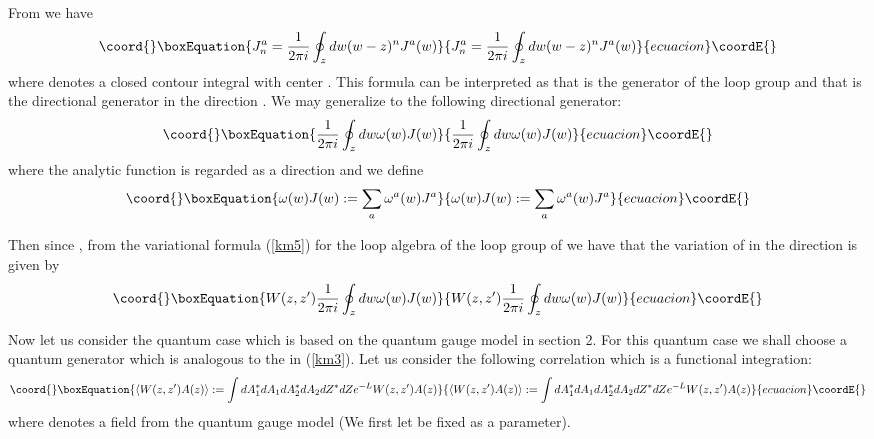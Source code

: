 \documentclass[a4paper,a4paper]{article}
\begin{document}
From \coordHE{} we have 
\begin{equation}\coord{}\boxEquation{
J_n^a=  \frac{1}{2\pi i}\oint_z dw (w-z)^{n}J^a(w)  
\label{km4}
}{
J_n^a=  \frac{1}{2\pi i}\oint_z dw (w-z)^{n}J^a(w)  
}{ecuacion}\coordE{}\end{equation}
where \coordHE{} denotes a closed contour integral  with center \coordHE{}. This formula can be interpreted as that
\coordHE{} is the generator of the loop group and that
\coordHE{} is the directional generator in the direction
\coordHE{}. We may generalize \myHighlight{$(\ref{km4})$}\coordHE{}
to the following  directional generator: 
\begin{equation}\coord{}\boxEquation{
  \frac{1}{2\pi i}\oint_z dw \omega(w)J(w)  
\label{km5}
}{
  \frac{1}{2\pi i}\oint_z dw \omega(w)J(w)  
}{ecuacion}\coordE{}\end{equation}
where the analytic function 
\coordHE{} is regarded
as a direction and we define
\begin{equation}\coord{}\boxEquation{
 \omega(w)J(w):= \sum_a \omega^a(w)J^a 
\label{km5a}
}{
 \omega(w)J(w):= \sum_a \omega^a(w)J^a 
}{ecuacion}\coordE{}\end{equation}

Then since \coordHE{},
from the variational formula (\ref{km5}) for the
loop algebra of the loop group of \coordHE{} we have that the variation
of \coordHE{} in the direction \coordHE{}
is given by
\begin{equation}\coord{}\boxEquation{
W(z,z')
  \frac{1}{2\pi i}\oint_z dw \omega(w)J(w)  
\label{km6}
}{
W(z,z')
  \frac{1}{2\pi i}\oint_z dw \omega(w)J(w)  
}{ecuacion}\coordE{}\end{equation}
 

Now let us consider the quantum case which is based
on the quantum gauge model in section 2. For this quantum case
we shall choose a quantum generator \coordHE{} which is
analogous to the \coordHE{} in (\ref{km3}).
Let us consider the following correlation
which is a functional integration:
\begin{equation}\coord{}\boxEquation{
\langle W(z,z')A(z) \rangle :=  
\int dA_1^{*}dA_1dA_2^{*}dA_2dZ^{*}dZ  e^{-L} W(z,z')A(z)
\label{n8a}
}{
\langle W(z,z')A(z) \rangle :=  
\int dA_1^{*}dA_1dA_2^{*}dA_2dZ^{*}dZ  e^{-L} W(z,z')A(z)
}{ecuacion}\coordE{}\end{equation}
where \coordHE{} denotes a field from the quantum gauge
model (We first let \coordHE{} be fixed as a parameter). 
\end{document}
